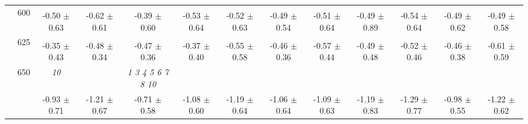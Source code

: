 \begin{table}[h]
{\begin{tabular}{
        ccccccccccccc}
 & \multirow{2}{*}{600}& & & & & & & & & & &  \\ 
 & & -0.50 $\pm$ 0.63& -0.62 $\pm$ 0.61& -0.39 $\pm$ 0.60& -0.53 $\pm$ 0.64& -0.52 $\pm$ 0.63& -0.49 $\pm$ 0.54& -0.51 $\pm$ 0.64& -0.49 $\pm$ 0.89& -0.54 $\pm$ 0.64& -0.49 $\pm$ 0.62& -0.49 $\pm$ 0.58 \\ 
 & \multirow{2}{*}{625}& \cellcolor[HTML]{EFEFEF} & \cellcolor[HTML]{EFEFEF} & \cellcolor[HTML]{EFEFEF} & \cellcolor[HTML]{EFEFEF} & \cellcolor[HTML]{EFEFEF} & \cellcolor[HTML]{EFEFEF} & \cellcolor[HTML]{EFEFEF} & \cellcolor[HTML]{EFEFEF} & \cellcolor[HTML]{EFEFEF} & \cellcolor[HTML]{EFEFEF} & \cellcolor[HTML]{EFEFEF}  \\ 
 & & \cellcolor[HTML]{EFEFEF} -0.35 $\pm$ 0.43& \cellcolor[HTML]{EFEFEF} -0.48 $\pm$ 0.34& \cellcolor[HTML]{EFEFEF} -0.47 $\pm$ 0.36& \cellcolor[HTML]{EFEFEF} -0.37 $\pm$ 0.40& \cellcolor[HTML]{EFEFEF} -0.55 $\pm$ 0.58& \cellcolor[HTML]{EFEFEF} -0.46 $\pm$ 0.36& \cellcolor[HTML]{EFEFEF} -0.57 $\pm$ 0.44& \cellcolor[HTML]{EFEFEF} -0.49 $\pm$ 0.48& \cellcolor[HTML]{EFEFEF} -0.52 $\pm$ 0.46& \cellcolor[HTML]{EFEFEF} -0.46 $\pm$ 0.38& \cellcolor[HTML]{EFEFEF} -0.61 $\pm$ 0.59 \\ 
 & \multirow{2}{*}{650}& \textit{ 10 }& & \textit{  1  3  4  5  6  7  8 10 }& & & & & & & &  \\ 
 & & -0.93 $\pm$ 0.71& -1.21 $\pm$ 0.67& -0.71 $\pm$ 0.58& -1.08 $\pm$ 0.60& -1.19 $\pm$ 0.64& -1.06 $\pm$ 0.64& -1.09 $\pm$ 0.63& -1.19 $\pm$ 0.83& -1.29 $\pm$ 0.77& -0.98 $\pm$ 0.55& -1.22 $\pm$ 0.62 \\ \midrule 

        \bottomrule
        \end{tabular}%
        }

        \end{table}
        
